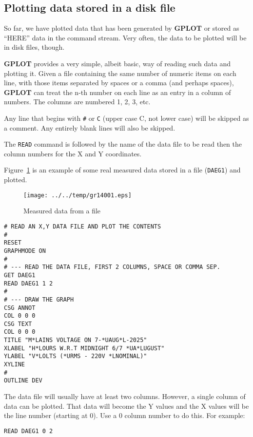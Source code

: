 \documentclass[a4paper,twoside,11pt]{article}
\makeatletter
\def\maxwidth{%
  \ifdim\Gin@nat@width>\linewidth
    \linewidth
  \else
    \Gin@nat@width
  \fi
}
\newcommand{\newpara}{\par\vspace{4mm}\noindent}
\makeatother
\begin{document}
\subsection{Plotting data stored in a disk file}\label{plotting-data-stored-in-a-disk-file}
\newpara
So far, we have plotted data that has been generated by \textbf{GPLOT} or stored
as ``HERE'' data in the command stream. Very often, the data to be
plotted will be in disk files, though.

\newpara
\textbf{GPLOT} provides a very simple, albeit basic, way of reading such data and
plotting it. Given a file containing the same number of numeric items on
each line, with those items separated by spaces or a comma (and perhaps
spaces), \textbf{GPLOT} can treat the n-th number on each line as an entry in a
column of numbers. The columns are numbered 1, 2, 3, etc.

\newpara
Any line that begins with \texttt{\#} or \texttt{C} (upper case C, not
lower case) will be skipped as a comment. Any entirely blank lines will
also be skipped.

\newpara
The \texttt{READ} command is followed by the name of the data file to be
read then the column numbers for the X and Y coordinates.

\newpara
Figure~\ref{fig:gr14001} is an example of some real measured data stored in a file
(\texttt{DAEG1}) and plotted.

\begin{figure}
  \centering
  \texttt{[image: ../../temp/gr14001.eps]}
  \caption{Measured data from a file}
  \label{fig:gr14001}
\end{figure}

\begin{lstlisting}
# READ AN X,Y DATA FILE AND PLOT THE CONTENTS
#
RESET
GRAPHMODE ON
#
# --- READ THE DATA FILE, FIRST 2 COLUMNS, SPACE OR COMMA SEP.
GET DAEG1
READ DAEG1 1 2
#
# --- DRAW THE GRAPH
CSG ANNOT
COL 0 0 0
CSG TEXT
COL 0 0 0
TITLE "M*LAINS VOLTAGE ON 7-*UAUG*L-2025"
XLABEL "H*LOURS W.R.T MIDNIGHT 6/7 *UA*LUGUST"
YLABEL "V*LOLTS (*URMS - 220V *LNOMINAL)"
XYLINE
#
OUTLINE DEV
\end{lstlisting}

\newpara
The data file will usually have at least two columns. However, a single
column of data can be plotted. That data will become the Y values and
the X values will be the line number (starting at 0). Use a 0 column
number to do this. For example:

\begin{lstlisting}
READ DAEG1 0 2
\end{lstlisting}
\end{document}
